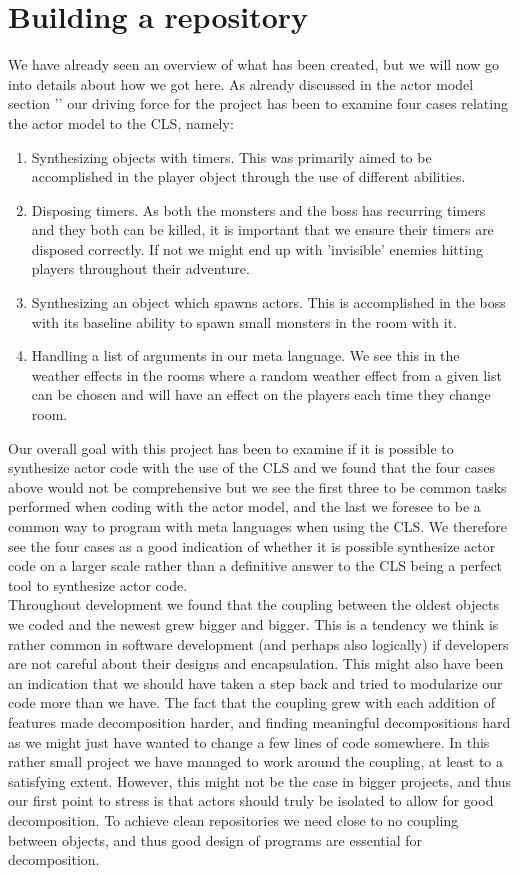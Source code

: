 \section{Building a repository}
We have already seen an overview of what has been created, but we will now go into details about how we got here. As already discussed in the actor model section '' our driving force for the project has been to examine four cases relating the actor model to the CLS, namely:
\begin{enumerate}
	\item Synthesizing objects with timers. This was primarily aimed to be accomplished in the player object through the use of different abilities.
	\item Disposing timers. As both the monsters and the boss has recurring timers and they both can be killed, it is important that we ensure their timers are disposed correctly. If not we might end up with 'invisible' enemies hitting players throughout their adventure.
	\item Synthesizing an object which spawns actors. This is accomplished in the boss with its baseline ability to spawn small monsters in the room with it.
	\item Handling a list of arguments in our meta language. We see this in the weather effects in the rooms where a random weather effect from a given list can be chosen and will have an effect on the players each time they change room.
\end{enumerate}
Our overall goal with this project has been to examine if it is possible to synthesize actor code with the use of the CLS and we found that the four cases above would not be comprehensive but we see the first three to be common tasks performed when coding with the actor model, and the last we foresee to be a common way to program with meta languages when using the CLS. We therefore see the four cases as a good indication of whether it is possible synthesize actor code on a larger scale rather than a definitive answer to the CLS being a perfect tool to synthesize actor code.\\

Throughout development we found that the coupling between the oldest objects we coded and the newest grew bigger and bigger. This is a tendency we think is rather common in software development (and perhaps also logically) if developers are not careful about their designs and encapsulation. This might also have been an indication that we should have taken a step back and tried to modularize our code more than we have. The fact that the coupling grew with each addition of features made decomposition harder, and finding meaningful decompositions hard as we might just have wanted to change a few lines of code somewhere. In this rather small project we have managed to work around the coupling, at least to a satisfying extent. However, this might not be the case in bigger projects, and thus our first point to stress is that actors should truly be isolated to allow for good decomposition. To achieve clean repositories we need close to no coupling between objects, and thus good design of programs are essential for decomposition. 

